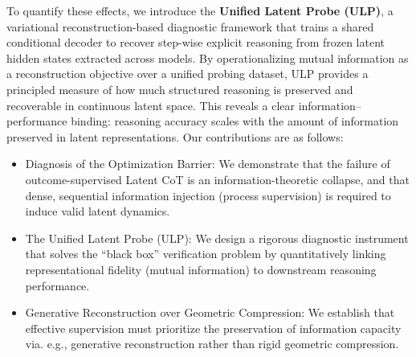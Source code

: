 To quantify these effects, we introduce the \textbf{Unified Latent Probe (ULP)}, a variational reconstruction-based diagnostic framework that trains a shared conditional decoder to recover step-wise explicit reasoning from frozen latent hidden states extracted across models. By operationalizing mutual information as a reconstruction objective over a unified probing dataset, ULP provides a principled measure of how much structured reasoning is preserved and recoverable in continuous latent space. This reveals a clear information–performance binding: reasoning accuracy scales with the amount of information preserved in latent representations.
Our contributions are as follows:
\begin{itemize}
    \item Diagnosis of the Optimization Barrier: We demonstrate that the failure of outcome-supervised Latent CoT is an information-theoretic collapse, and that dense, sequential information injection (process supervision) is required to induce valid latent dynamics.
    \item The Unified Latent Probe (ULP): We design a rigorous diagnostic instrument that solves the ``black box'' verification problem by quantitatively linking representational fidelity (mutual information) to downstream reasoning performance.
    \item Generative Reconstruction over Geometric Compression: We establish that effective supervision must prioritize the preservation of information capacity via. e.g., generative reconstruction rather than rigid geometric compression.
\end{itemize}

